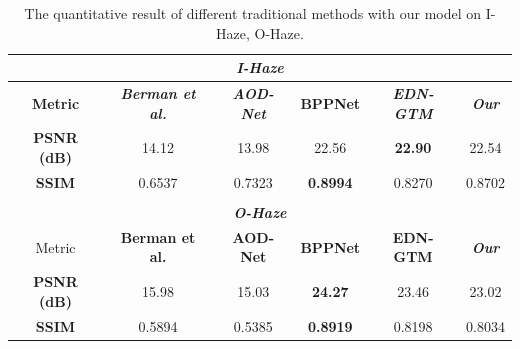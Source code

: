 \begin{table}[h]
\caption{The quantitative  result of different traditional methods with our model on I-Haze, O-Haze.
}
\label{tab:my-table}
\begin{tabular}{cccccc}
\multicolumn{6}{c}{\textit{\textbf{I-Haze}}  \cite{i_haze} }                                   \\ \hline
\textbf{Metric} & \textit{\textbf{Berman et al.}} \cite{prior1} & \textit{\textbf{AOD-Net}} \cite{aod}  & \textbf{BPPNet} \cite{bppnet_sota} & \textit{\textbf{EDN-GTM}} \cite{sec_sota} & \textit{\textbf{Our}} \\ \hline
\textbf{PSNR (dB)} & 14.12  & 13.98  & 22.56           & \textbf{22.90}  & 22.54 \\
\textbf{SSIM}      & 0.6537 & 0.7323 & \textbf{0.8994} & 0.8270 & 0.8702         \\ \hline
\multicolumn{6}{l}{}                                                             \\
\multicolumn{6}{c}{\textit{\textbf{O-Haze}}  \cite{o_haze} }                                   \\ \hline
Metric          & \textbf{Berman et al.}   \cite{prior1}       & \textbf{AOD-Net}    \cite{aod}      & \textbf{BPPNet} \cite{bppnet_sota} & \textbf{EDN-GTM}  \cite{sec_sota}       & \textit{\textbf{Our}} \\ \hline
\textbf{PSNR (dB)} & 15.98  & 15.03  & \textbf{24.27}  & 23.46  & 23.02          \\
\textbf{SSIM}      & 0.5894 & 0.5385 & \textbf{0.8919} & 0.8198 & 0.8034         \\ \hline
\end{tabular}%
\end{table}
